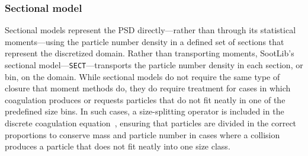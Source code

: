\documentclass[preprint,letterpaper]{elsarticle}
\begin{document}

\subsubsection{Sectional model}
\label{s:sectional}

Sectional models represent the PSD directly---rather than through its statistical moments---using the particle number density in a defined set of sections that represent the discretized domain. Rather than transporting moments, SootLib's sectional model---\texttt{SECT}---transports the particle number density in each section, or bin, on the domain.
While sectional models do not require the same type of closure that moment methods do, they do require treatment for cases in which coagulation produces or requests particles that do not fit neatly in one of the predefined size bins. In such cases, a size-splitting operator is included in the discrete coagulation equation~\cite{Lehtinen_2001}, ensuring that particles are divided in the correct proportions to conserve mass and particle number in cases where a collision produces a particle that does not fit neatly into one size class.
\end{document}
